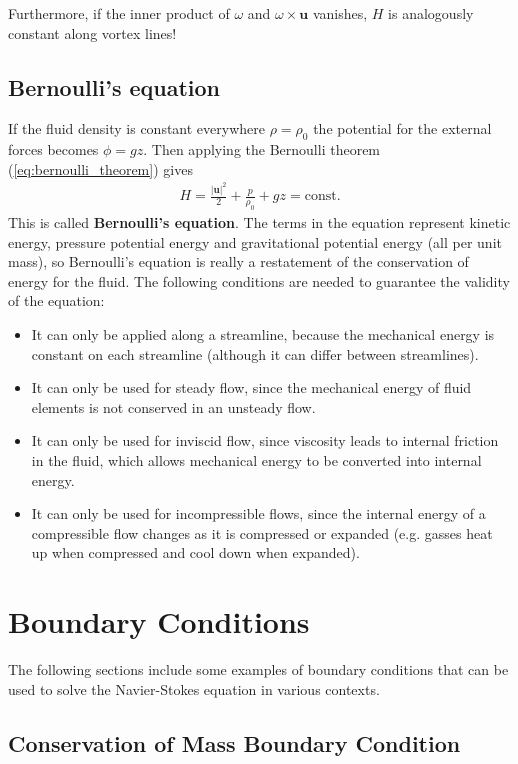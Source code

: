 \documentclass[a4paper, 12pt]{article}
\numberwithin{equation}{subsubsection}
\begin{document}
Furthermore, if the inner product of $\omega$ and $\omega \times \mathbf{u}$ vanishes, $H$ is analogously constant along vortex lines!

\subsection{Bernoulli's equation}

If the fluid density is constant everywhere $\rho = \rho_0$ the potential for the external forces becomes $\phi = g z$. Then applying the Bernoulli theorem (\ref{eq:bernoulli_theorem}) gives
\begin{align}
	H = \frac{|\mathbf{u}|^2}{2} + \frac{p}{\rho_0} + g z = \text{const.}
\end{align}
This is called \textbf{Bernoulli's equation}. The terms in the equation represent kinetic energy, pressure potential energy and gravitational potential energy (all per unit mass), so Bernoulli's equation is really a restatement of the conservation of energy for the fluid. The following conditions are needed to guarantee the validity of the equation:
\begin{itemize}
	\item It can only be applied along a streamline, because the mechanical energy is constant on each streamline (although it can differ between streamlines).
	\item It can only be used for steady flow, since the mechanical energy of fluid elements is not conserved in an unsteady flow.
	\item It can only be used for inviscid flow, since viscosity leads to internal friction in the fluid, which allows mechanical energy to be converted into internal energy.
	\item It can only be used for incompressible flows, since the internal energy of a compressible flow changes as it is compressed or expanded (e.g. gasses heat up when compressed and cool down when expanded).
\end{itemize}

\newpage
\section{Boundary Conditions}
The following sections include some examples of boundary conditions that can be used to solve the Navier-Stokes equation in various contexts.

\subsection{Conservation of Mass Boundary Condition}
\end{document}

